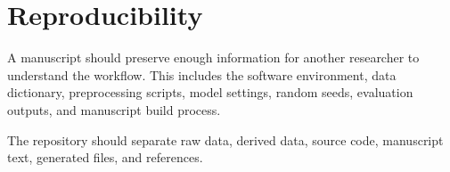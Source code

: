 \section{Reproducibility}

A manuscript should preserve enough information for another researcher to understand the workflow. This includes the software environment, data dictionary, preprocessing scripts, model settings, random seeds, evaluation outputs, and manuscript build process.

The repository should separate raw data, derived data, source code, manuscript text, generated files, and references.
